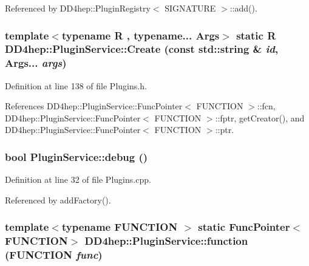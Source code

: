 Referenced by DD4hep::PluginRegistry$<$ SIGNATURE $>$::add().\hypertarget{class_d_d4hep_1_1_plugin_service_a872e355f59bbe197c0b61c6f0571f8c8}{
\subsubsection[{Create}]{\setlength{\rightskip}{0pt plus 5cm}template$<$typename R , typename... Args$>$ static R DD4hep::PluginService::Create (const std::string \& {\em id}, \/  Args... {\em args})}}
\label{class_d_d4hep_1_1_plugin_service_a872e355f59bbe197c0b61c6f0571f8c8}


Definition at line 138 of file Plugins.h.

References DD4hep::PluginService::FuncPointer$<$ FUNCTION $>$::fcn, DD4hep::PluginService::FuncPointer$<$ FUNCTION $>$::fptr, getCreator(), and DD4hep::PluginService::FuncPointer$<$ FUNCTION $>$::ptr.\hypertarget{class_d_d4hep_1_1_plugin_service_a90761f21b553c0285eff00839dd912e8}{
\subsubsection[{debug}]{\setlength{\rightskip}{0pt plus 5cm}bool PluginService::debug ()}}
\label{class_d_d4hep_1_1_plugin_service_a90761f21b553c0285eff00839dd912e8}


Definition at line 32 of file Plugins.cpp.

Referenced by addFactory().\hypertarget{class_d_d4hep_1_1_plugin_service_aa18d81d33b408245a85fc5fe36a5a607}{
\subsubsection[{function}]{\setlength{\rightskip}{0pt plus 5cm}template$<$typename FUNCTION $>$ static {\bf FuncPointer}$<$FUNCTION$>$ DD4hep::PluginService::function (FUNCTION {\em func})}}
\label{class_d_d4hep_1_1_plugin_service_aa18d81d33b408245a85fc5fe36a5a607}


